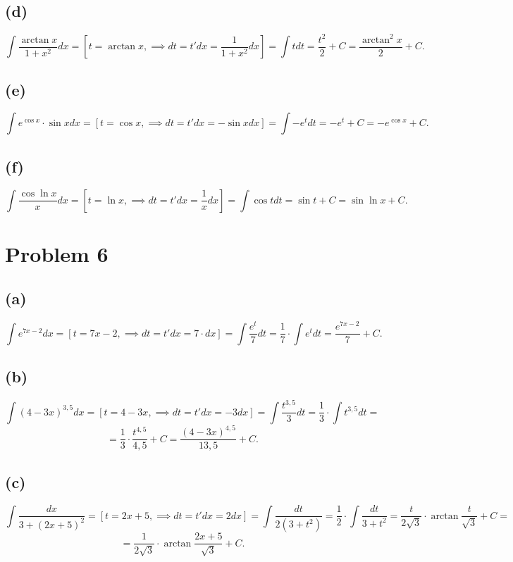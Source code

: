 \documentclass{article}
\begin{document}
\subsection*{(d)}
$$\int\frac{\arctan{x}}{1 + x^2}dx = \left[t = \arctan{x},\implies dt = t'dx = \frac{1}{1 + x^2}dx\right] = \int tdt = \frac{t^2}{2} + C = \frac{\arctan^2{x}}{2} + C.$$
\subsection*{(e)}
$$\int e^{\cos{x}}\cdot\sin{x}dx = \left[t = \cos{x},\implies dt = t'dx = -\sin{x}dx\right] = \int-e^tdt = -e^t + C = -e^{\cos{x}} + C.$$
\subsection*{(f)}
$$\int\frac{\cos{\ln{x}}}{x}dx = \left[t = \ln{x},\implies dt = t'dx = \frac{1}{x}dx\right] = \int\cos{t}dt = \sin{t} + C = \sin{\ln{x}} + C.$$
\newpage
\section*{Problem 6}
\subsection*{(a)}
$$\int e^{7x - 2}dx = \left[t = 7x - 2,\implies dt = t'dx = 7\cdot dx\right] = \int\frac{e^t}{7}dt = \frac{1}{7}\cdot\int e^tdt = \frac{e^{7x - 2}}{7} + C.$$
\subsection*{(b)}
$$\int(4 - 3x)^{3,5}dx = \left[t = 4 - 3x,\implies dt = t'dx = -3dx\right] = \int\frac{t^{3,5}}{3}dt = \frac{1}{3}\cdot\int t^{3,5}dt = $$
$$ = \frac{1}{3}\cdot\frac{t^{4,5}}{4,5} + C = \frac{(4 - 3x)^{4,5}}{13,5} + C.$$
\subsection*{(c)}
$$\int\frac{dx}{3 + (2x + 5)^2} = \left[t = 2x + 5,\implies dt = t'dx = 2dx\right] = \int\frac{dt}{2(3 + t^2)} = \frac{1}{2}\cdot\int\frac{dt}{3 + t^2} = \frac{t}{2\sqrt{3}}\cdot\arctan{\frac{t}{\sqrt{3}}} + C = $$
$$ = \frac{1}{2\sqrt{3}}\cdot\arctan{\frac{2x + 5}{\sqrt{3}}} + C.$$
\end{document}
